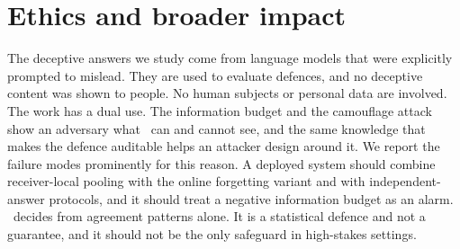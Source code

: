 \section{Ethics and broader impact}\label{app:ethics}
The deceptive answers we study come from language models that were explicitly prompted to mislead. They are used to evaluate defences, and no deceptive content was shown to people. No human subjects or personal data are involved. The work has a dual use. The information budget and the camouflage attack show an adversary what \race\ can and cannot see, and the same knowledge that makes the defence auditable helps an attacker design around it. We report the failure modes prominently for this reason. A deployed system should combine receiver-local pooling with the online forgetting variant and with independent-answer protocols, and it should treat a negative information budget as an alarm. \race\ decides from agreement patterns alone. It is a statistical defence and not a guarantee, and it should not be the only safeguard in high-stakes settings.
